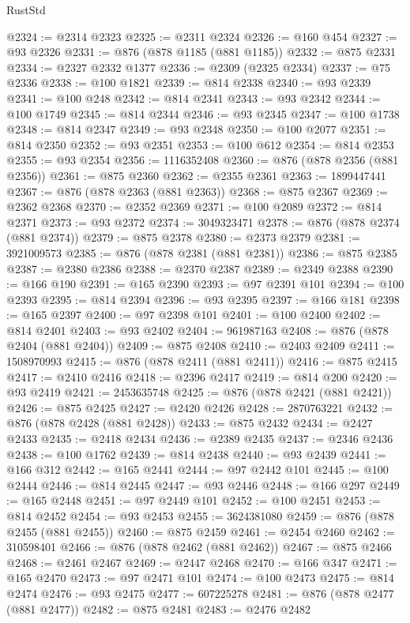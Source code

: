 \begin{lexlean}{RustStd}
\begin{coremodule}
@2324 := @2314 @2323
@2325 := @2311 @2324
@2326 := @160 @454
@2327 := @93 @2326
@2331 := @876 (@878 @1185 (@881 @1185))
@2332 := @875 @2331
@2334 := @2327 @2332 @1377
@2336 := @2309 (@2325 @2334)
@2337 := @75 @2336
@2338 := @100 @1821
@2339 := @814 @2338
@2340 := @93 @2339
@2341 := @100 @248
@2342 := @814 @2341
@2343 := @93 @2342
@2344 := @100 @1749
@2345 := @814 @2344
@2346 := @93 @2345
@2347 := @100 @1738
@2348 := @814 @2347
@2349 := @93 @2348
@2350 := @100 @2077
@2351 := @814 @2350
@2352 := @93 @2351
@2353 := @100 @612
@2354 := @814 @2353
@2355 := @93 @2354
@2356 := 1116352408
@2360 := @876 (@878 @2356 (@881 @2356))
@2361 := @875 @2360
@2362 := @2355 @2361
@2363 := 1899447441
@2367 := @876 (@878 @2363 (@881 @2363))
@2368 := @875 @2367
@2369 := @2362 @2368
@2370 := @2352 @2369
@2371 := @100 @2089
@2372 := @814 @2371
@2373 := @93 @2372
@2374 := 3049323471
@2378 := @876 (@878 @2374 (@881 @2374))
@2379 := @875 @2378
@2380 := @2373 @2379
@2381 := 3921009573
@2385 := @876 (@878 @2381 (@881 @2381))
@2386 := @875 @2385
@2387 := @2380 @2386
@2388 := @2370 @2387
@2389 := @2349 @2388
@2390 := @166 @190
@2391 := @165 @2390
@2393 := @97 @2391 @101
@2394 := @100 @2393
@2395 := @814 @2394
@2396 := @93 @2395
@2397 := @166 @181
@2398 := @165 @2397
@2400 := @97 @2398 @101
@2401 := @100 @2400
@2402 := @814 @2401
@2403 := @93 @2402
@2404 := 961987163
@2408 := @876 (@878 @2404 (@881 @2404))
@2409 := @875 @2408
@2410 := @2403 @2409
@2411 := 1508970993
@2415 := @876 (@878 @2411 (@881 @2411))
@2416 := @875 @2415
@2417 := @2410 @2416
@2418 := @2396 @2417
@2419 := @814 @200
@2420 := @93 @2419
@2421 := 2453635748
@2425 := @876 (@878 @2421 (@881 @2421))
@2426 := @875 @2425
@2427 := @2420 @2426
@2428 := 2870763221
@2432 := @876 (@878 @2428 (@881 @2428))
@2433 := @875 @2432
@2434 := @2427 @2433
@2435 := @2418 @2434
@2436 := @2389 @2435
@2437 := @2346 @2436
@2438 := @100 @1762
@2439 := @814 @2438
@2440 := @93 @2439
@2441 := @166 @312
@2442 := @165 @2441
@2444 := @97 @2442 @101
@2445 := @100 @2444
@2446 := @814 @2445
@2447 := @93 @2446
@2448 := @166 @297
@2449 := @165 @2448
@2451 := @97 @2449 @101
@2452 := @100 @2451
@2453 := @814 @2452
@2454 := @93 @2453
@2455 := 3624381080
@2459 := @876 (@878 @2455 (@881 @2455))
@2460 := @875 @2459
@2461 := @2454 @2460
@2462 := 310598401
@2466 := @876 (@878 @2462 (@881 @2462))
@2467 := @875 @2466
@2468 := @2461 @2467
@2469 := @2447 @2468
@2470 := @166 @347
@2471 := @165 @2470
@2473 := @97 @2471 @101
@2474 := @100 @2473
@2475 := @814 @2474
@2476 := @93 @2475
@2477 := 607225278
@2481 := @876 (@878 @2477 (@881 @2477))
@2482 := @875 @2481
@2483 := @2476 @2482

\end{coremodule}
\end{lexlean}
